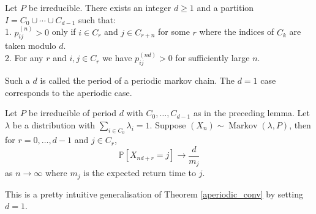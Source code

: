 \begin{lemma}
    Let $P$ be irreducible.
    There exists an integer $d\ge 1$ and a partition $I=C_0\cup\cdots\cup C_{d-1}$ such that:\\
    1. $p_{ij}^{(n)}>0$ only if $i\in C_r$ and $j\in C_{r+n}$ for some $r$ where the indices of $C_k$ are taken modulo $d$.\\
    2. For any $r$ and $i,j\in C_r$ we have $p_{ij}^{(nd)}>0$ for sufficiently large $n$.
\end{lemma}
Such a $d$ is called the period of a periodic markov chain.
The $d=1$ case corresponds to the aperiodic case.
\begin{theorem}
    Let $P$ be irreducible of period $d$ with $C_0,\ldots, C_{d-1}$ as in the preceding lemma.
    Let $\lambda$ be a distribution with $\sum_{i\in C_0}\lambda_i=1$.
    Suppose $(X_n)\sim\operatorname{Markov}(\lambda,P)$, then for $r=0,\ldots,d-1$ and $j\in C_r$,
    $$\mathbb P[X_{nd+r}=j]\to\frac{d}{m_j}$$
    as $n\to\infty$ where $m_j$ is the expected return time to $j$.
\end{theorem}
This is a pretty intuitive generalisation of Theorem \ref{aperiodic_conv} by setting $d=1$.